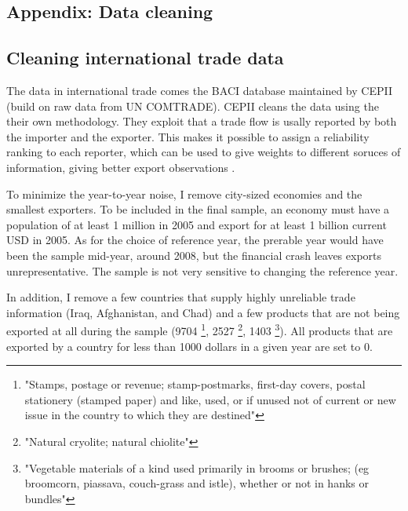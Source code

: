 \documentclass[11pt]{article}
\begin{document}
\newpage



\begin{appendices}

\newpage

\section{Appendix: Data cleaning}%
\label{sec:appendix_data_cleaning}

\subsection{Cleaning international trade data}%
\label{sub:cleaning_international_trade_data}

The data in international trade comes the BACI database maintained by CEPII (build on raw data from UN COMTRADE). CEPII cleans the data using the their own methodology. They exploit that a trade flow is usally reported by both the importer and the exporter. This makes it possible to assign a reliability ranking to each reporter, which can be used to give weights to different soruces of information, giving better export observations \citep{gualier_baci_2010}. 

To minimize the year-to-year noise, I remove city-sized economies and the smallest exporters. To be included in the final sample, an economy must have a population of at least 1 million in 2005 and export for at least 1 billion current USD in 2005. As for the choice of reference year, the prerable year would have been the sample mid-year, around 2008, but the financial crash leaves exports unrepresentative. The sample is not very sensitive to changing the reference year. 

In addition, I remove a few countries that supply highly unreliable trade information (Iraq, Afghanistan, and Chad) and a few products that are not being exported at all during the sample (9704 \footnote{"Stamps, postage or revenue; stamp-postmarks, first-day covers, postal stationery (stamped paper) and like, used, or if unused not of current or new issue in the country to which they are destined"}, 2527 \footnote{"Natural cryolite; natural chiolite"}, 1403 \footnote{"Vegetable materials of a kind used primarily in brooms or brushes; (eg broomcorn, piassava, couch-grass and istle), whether or not in hanks or bundles"}). All products that are exported by a country for less than 1000 dollars in a given year are set to 0. 


\end{appendices}
\end{document}
